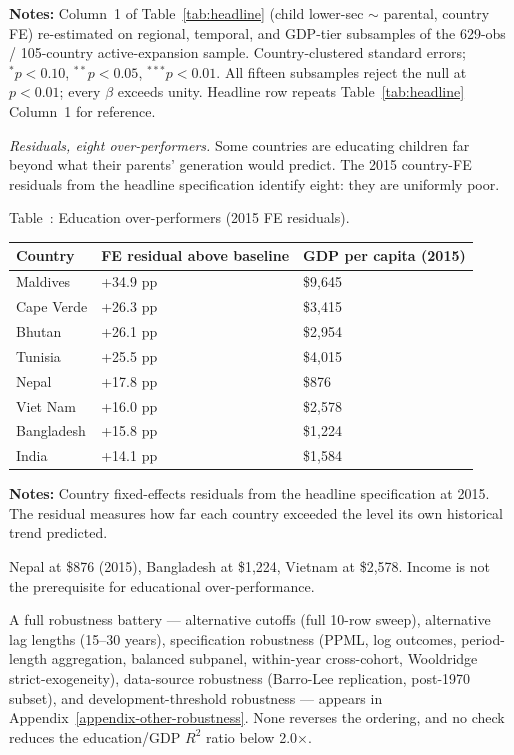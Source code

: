 \documentclass[12pt,letterpaper]{article}
\begin{document}
\begin{minipage}{\dimexpr\textwidth-2em}
\scriptsize
\textbf{Notes:} Column~1 of Table~\ref{tab:headline} (child lower-sec
$\sim$ parental, country FE) re-estimated on regional, temporal, and
GDP-tier subsamples of the 629-obs / 105-country active-expansion
sample. Country-clustered standard errors; $^{*}p<0.10$,
$^{**}p<0.05$, $^{***}p<0.01$. All fifteen subsamples reject the null
at $p<0.01$; every $\beta$ exceeds unity. Headline row repeats
Table~\ref{tab:headline} Column~1 for reference.
\end{minipage}

\emph{Residuals, eight over-performers.} Some countries are educating
children far beyond what their parents' generation would predict. The
2015 country-FE residuals from the headline specification identify
eight: they are uniformly poor.

\label{tab:over-performers}Table~\thetable: Education over-performers (2015 FE residuals).

\begin{longtable}[]{@{}lll@{}}
\toprule
Country & FE residual above baseline & GDP per capita (2015) \\
\midrule
\endhead
Maldives & +34.9 pp & \$9,645 \\
Cape Verde & +26.3 pp & \$3,415 \\
Bhutan & +26.1 pp & \$2,954 \\
Tunisia & +25.5 pp & \$4,015 \\
Nepal & +17.8 pp & \$876 \\
Viet Nam & +16.0 pp & \$2,578 \\
Bangladesh & +15.8 pp & \$1,224 \\
India & +14.1 pp & \$1,584 \\
\bottomrule
\end{longtable}

\begin{minipage}{\dimexpr\textwidth-2em}
\scriptsize
\textbf{Notes:} Country fixed-effects residuals from the headline
specification at 2015. The residual measures how far each country
exceeded the level its own historical trend predicted.
\end{minipage}

Nepal at \$876 (2015), Bangladesh at \$1,224, Vietnam at \$2,578. Income is not the prerequisite for educational over-performance.

A full robustness battery --- alternative cutoffs (full 10-row sweep),
alternative lag lengths (15--30 years), specification robustness
(PPML, log outcomes, period-length aggregation, balanced subpanel,
within-year cross-cohort, Wooldridge strict-exogeneity), data-source
robustness (Barro-Lee replication, post-1970 subset), and
development-threshold robustness --- appears in Appendix~\ref{appendix-other-robustness}.
None reverses the ordering, and no check reduces the education/GDP
$R^2$ ratio below 2.0$\times$.
\end{document}
